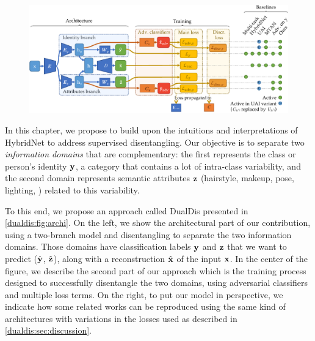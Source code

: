 \begin{figure}
    \centering
    \hspace*{-2cm}
    \includegraphics[width=\linewidth]{images/dualdis_archi.pdf}
    \hspace*{-2cm}
    \label{dualdis:fig:archi}
\end{figure}

In this chapter, we propose to build upon the intuitions and interpretations of HybridNet to address supervised disentangling. Our objective is to separate two \textit{information domains} that are complementary: the first represents the class or person's identity $\mathbf{y}$, \ie a category that contains a lot of intra-class variability, and the second domain represents semantic attributes $\mathbf{z}$ (\eg hairstyle, makeup, pose, lighting, \etc) related to this variability.

To this end, we propose an approach called DualDis presented in \autoref{dualdis:fig:archi}. On the left, we show the architectural part of our contribution, using a two-branch model and disentangling to separate the two information domains. Those domains have classification labels $\mathbf{y}$ and $\mathbf{z}$ that we want to predict ($\hat{\mathbf{y}}$, $\hat{\mathbf{z}}$), along with a reconstruction $\hat{\mathbf{x}}$ of the input $\mathbf{x}$. In the center of the figure, we describe the second part of our approach which is the training process designed to successfully disentangle the two domains, using adversarial classifiers and multiple loss terms. On the right, to put our model in perspective, we indicate how some related works can be reproduced using the same kind of architectures with variations in the losses used as described in \autoref{dualdis:sec:discussion}.

